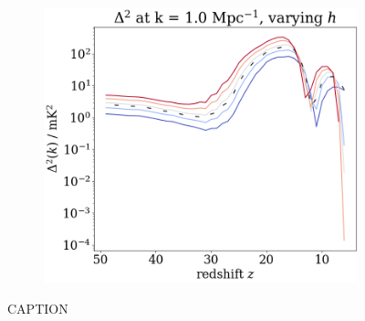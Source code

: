 \documentclass[floats,floatfix,showpacs,amssymb,prd,superscriptaddress,nofootinbib]{revtex4-2} %
\begin{document}
\begin{figure}[H]
\begin{subfigure}[b]{0.45\textwidth}
     \end{subfigure}
     \hfill
     \begin{subfigure}[b]{0.45\textwidth}
         \centering
         \includegraphics[width=\textwidth]{images/simulation_results/power_spectrum_fixed_k_1.0_h.png}
         \label{fig:power_spectrum_fixed_k_1.0_h}
     \end{subfigure}
        \caption{CAPTION}
        \label{fig:simulation_results_h}
\end{figure}



\end{document}
